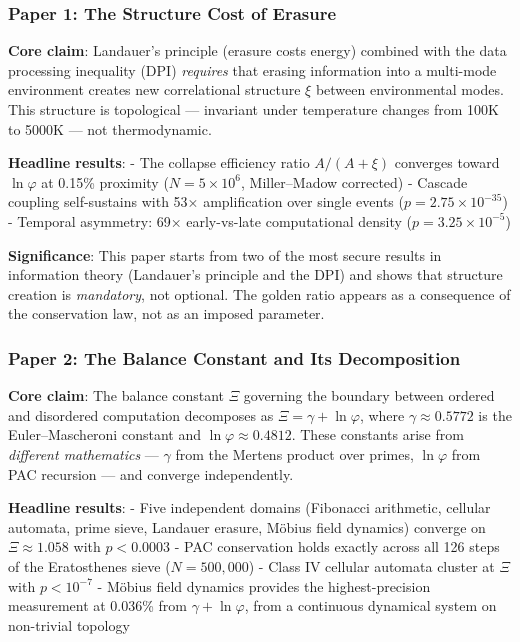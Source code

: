\documentclass[
  11pt,
  a4paper]{article}
\begin{document}
\subsubsection{Paper 1: The Structure Cost of
Erasure}\label{paper-1-the-structure-cost-of-erasure}

\textbf{Core claim}: Landauer's principle (erasure costs energy)
combined with the data processing inequality (DPI) \emph{requires} that
erasing information into a multi-mode environment creates new
correlational structure \(\xi\) between environmental modes. This
structure is topological --- invariant under temperature changes from
100K to 5000K --- not thermodynamic.

\textbf{Headline results}: - The collapse efficiency ratio
\(A/(A{+}\xi)\) converges toward \(\ln\varphi\) at 0.15\% proximity
(\(N = 5 \times 10^6\), Miller--Madow corrected) - Cascade coupling
self-sustains with 53× amplification over single events
(\(p = 2.75 \times 10^{-35}\)) - Temporal asymmetry: 69× early-vs-late
computational density (\(p = 3.25 \times 10^{-5}\))

\textbf{Significance}: This paper starts from two of the most secure
results in information theory (Landauer's principle and the DPI) and
shows that structure creation is \emph{mandatory}, not optional. The
golden ratio appears as a consequence of the conservation law, not as an
imposed parameter.

\subsubsection{Paper 2: The Balance Constant and Its
Decomposition}\label{paper-2-the-balance-constant-and-its-decomposition}

\textbf{Core claim}: The balance constant \(\Xi\) governing the boundary
between ordered and disordered computation decomposes as
\(\Xi = \gamma + \ln\varphi\), where \(\gamma \approx 0.5772\) is the
Euler--Mascheroni constant and \(\ln\varphi \approx 0.4812\). These
constants arise from \emph{different mathematics} --- \(\gamma\) from
the Mertens product over primes, \(\ln\varphi\) from PAC recursion ---
and converge independently.

\textbf{Headline results}: - Five independent domains (Fibonacci
arithmetic, cellular automata, prime sieve, Landauer erasure, Möbius
field dynamics) converge on \(\Xi \approx 1.058\) with \(p < 0.0003\) -
PAC conservation holds exactly across all 126 steps of the Eratosthenes
sieve (\(N = 500{,}000\)) - Class IV cellular automata cluster at
\(\Xi\) with \(p < 10^{-7}\) - Möbius field dynamics provides the
highest-precision measurement at 0.036\% from \(\gamma + \ln\varphi\),
from a continuous dynamical system on non-trivial topology
\end{document}

